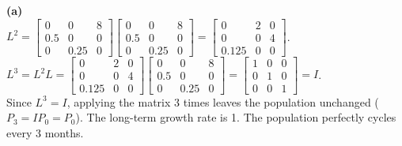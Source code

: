 \begin{solution}
\textbf{(a)} \\
$L^2 = \begin{bmatrix} 0 & 0 & 8 \\ 0.5 & 0 & 0 \\ 0 & 0.25 & 0 \end{bmatrix} \begin{bmatrix} 0 & 0 & 8 \\ 0.5 & 0 & 0 \\ 0 & 0.25 & 0 \end{bmatrix} = \begin{bmatrix} 0 & 2 & 0 \\ 0 & 0 & 4 \\ 0.125 & 0 & 0 \end{bmatrix}$. \\
$L^3 = L^2 L = \begin{bmatrix} 0 & 2 & 0 \\ 0 & 0 & 4 \\ 0.125 & 0 & 0 \end{bmatrix} \begin{bmatrix} 0 & 0 & 8 \\ 0.5 & 0 & 0 \\ 0 & 0.25 & 0 \end{bmatrix} = \begin{bmatrix} 1 & 0 & 0 \\ 0 & 1 & 0 \\ 0 & 0 & 1 \end{bmatrix} = I$. \\
Since $L^3 = I$, applying the matrix 3 times leaves the population unchanged ($P_3 = I P_0 = P_0$). The long-term growth rate is 1. The population perfectly cycles every 3 months.


\end{solution}
